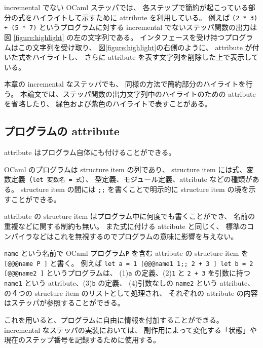 incremental でない OCaml ステッパでは、
各ステップで簡約が起こっている部分の式をハイライトして示すために
attribute を利用している。
例えば \texttt{(2 * 3) + (5 * 7)} というプログラムに対する
incremental でないステッパ関数の出力は図 \ref{figure:highlight} の左の文字列である。
インタフェースを受け持つプログラムはこの文字列を受け取り、
図\ref{figure:highlight}の右側のように、
attribute が付いた式をハイライトし、
さらに attribute を表す文字列を削除した上で表示している。

本章の incremental なステッパでも、
同様の方法で簡約部分のハイライトを行う。
本論文では、ステッパ関数の出力文字列中のハイライトのための attribute を省略したり、
緑色および紫色のハイライトで表すことがある。

\subsection{プログラムの attribute}
\label{OCamlのattribute-プログラムのattribute}
attribute はプログラム自体にも付けることができる。

OCaml のプログラムは structure item の列であり、
structure item には式、変数定義（\texttt{let 変数名 = 式}）、
型定義、モジュール定義、attribute などの種類がある。
structure item の間には \texttt{;;} を書くことで明示的に structure item の境を示すことができる。

attribute の structure item はプログラム中に何度でも書くことができ、
名前の重複などに関する制約も無い。
また式に付ける attribute と同じく、
標準のコンパイラなどはこれを無視するのでプログラムの意味に影響を与えない。

\texttt{name} という名前で OCaml プログラム\texttt{P}
を含む attribute の structure item を \texttt{[@@@name P ]} と書く。
例えば \texttt{let a = 1 [@@@name1 1;; 2 + 3 ] let b = 2 [@@@name2 ]}
というプログラムは、
(1)\texttt{a} の定義、(2)\texttt{1} と \texttt{2 + 3}
を引数に持つ \texttt{name1} という attribute、(3)\texttt{b} の定義、
(4)引数なしの \texttt{name2} という attribute、
の４つの structure item のリストとして処理され、
それぞれの attribute の内容はステッパが参照することができる。

これを用いると、プログラムに自由に情報を付加することができる。
incremental なステッパの実装においては、
副作用によって変化する「状態」や現在のステップ番号を記録するために使用する。
